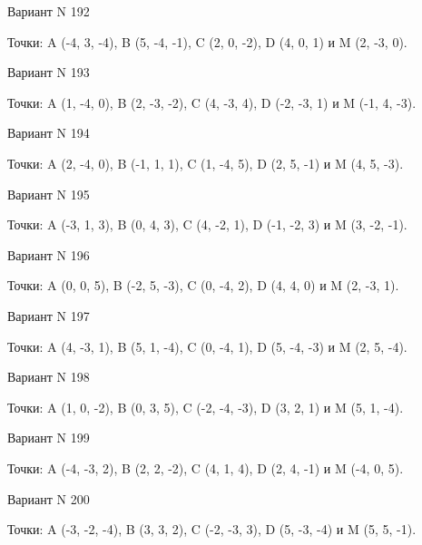 \documentclass[11pt]{report}
\begin{document}
Вариант N 192

Точки: A (-4, 3, -4), B (5, -4, -1), C (2, 0, -2), D (4, 0, 1) и M (2, -3, 0).

Вариант N 193

Точки: A (1, -4, 0), B (2, -3, -2), C (4, -3, 4), D (-2, -3, 1) и M (-1, 4, -3).

Вариант N 194

Точки: A (2, -4, 0), B (-1, 1, 1), C (1, -4, 5), D (2, 5, -1) и M (4, 5, -3).

Вариант N 195

Точки: A (-3, 1, 3), B (0, 4, 3), C (4, -2, 1), D (-1, -2, 3) и M (3, -2, -1).

Вариант N 196

Точки: A (0, 0, 5), B (-2, 5, -3), C (0, -4, 2), D (4, 4, 0) и M (2, -3, 1).

Вариант N 197

Точки: A (4, -3, 1), B (5, 1, -4), C (0, -4, 1), D (5, -4, -3) и M (2, 5, -4).

Вариант N 198

Точки: A (1, 0, -2), B (0, 3, 5), C (-2, -4, -3), D (3, 2, 1) и M (5, 1, -4).

Вариант N 199

Точки: A (-4, -3, 2), B (2, 2, -2), C (4, 1, 4), D (2, 4, -1) и M (-4, 0, 5).

Вариант N 200

Точки: A (-3, -2, -4), B (3, 3, 2), C (-2, -3, 3), D (5, -3, -4) и M (5, 5, -1).
\end{document}
